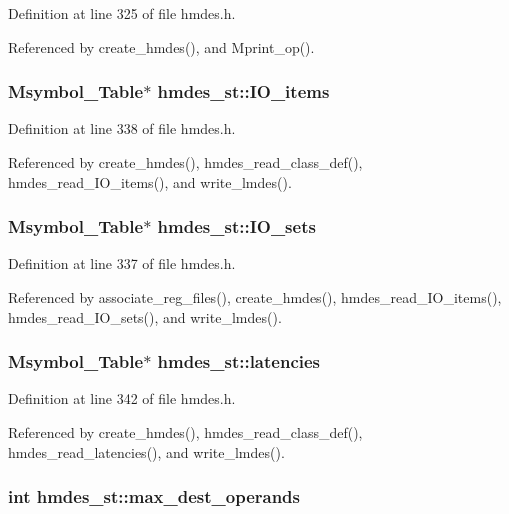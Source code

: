 Definition at line 325 of file hmdes.h.

Referenced by create\_\-hmdes(), and Mprint\_\-op().
\subsubsection{\setlength{\rightskip}{0pt plus 5cm}\bf{Msymbol\_\-Table}$\ast$ \bf{hmdes\_\-st::IO\_\-items}}\label{structhmdes__st_54c0db7ebd19e2926d32d6e8fc5689f2}




Definition at line 338 of file hmdes.h.

Referenced by create\_\-hmdes(), hmdes\_\-read\_\-class\_\-def(), hmdes\_\-read\_\-IO\_\-items(), and write\_\-lmdes().
\subsubsection{\setlength{\rightskip}{0pt plus 5cm}\bf{Msymbol\_\-Table}$\ast$ \bf{hmdes\_\-st::IO\_\-sets}}\label{structhmdes__st_1a722007506b5a11845e3eb11113c90b}




Definition at line 337 of file hmdes.h.

Referenced by associate\_\-reg\_\-files(), create\_\-hmdes(), hmdes\_\-read\_\-IO\_\-items(), hmdes\_\-read\_\-IO\_\-sets(), and write\_\-lmdes().
\subsubsection{\setlength{\rightskip}{0pt plus 5cm}\bf{Msymbol\_\-Table}$\ast$ \bf{hmdes\_\-st::latencies}}\label{structhmdes__st_7edd02826d139fa007a4d90348e81e7c}




Definition at line 342 of file hmdes.h.

Referenced by create\_\-hmdes(), hmdes\_\-read\_\-class\_\-def(), hmdes\_\-read\_\-latencies(), and write\_\-lmdes().
\subsubsection{\setlength{\rightskip}{0pt plus 5cm}int \bf{hmdes\_\-st::max\_\-dest\_\-operands}}\label{structhmdes__st_6227b0dc332b781877c35fdbf23d3772}




